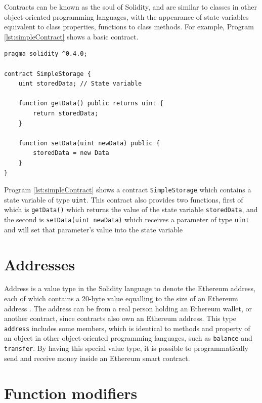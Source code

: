 \documentclass[twoside,draftfooter]{tutthesis} %
\begin{document}
Contracts can be known as the soul of Solidity, and are similar to classes in other object-oriented programming languages, with the appearance of state variables equivalent to class properties, functions to class methods. For example, Program \ref{lst:simpleContract} shows a basic contract.

\begin{lstlisting}[float,caption={A simple contract in Solidity.},label={lst:simpleContract},language=Solidity]
pragma solidity ^0.4.0;

contract SimpleStorage {
    uint storedData; // State variable
    
    function getData() public returns uint {
        return storedData;
    }
    
    function setData(uint newData) public {
        storedData = new Data
    }
}
\end{lstlisting}
\label{lst:simpleContract}

Program \ref{lst:simpleContract} shows a contract \texttt{SimpleStorage} which contains a state variable of type \texttt{uint}. This contract also provides two functions, first of which is \texttt{getData()} which returns the value of the state variable \texttt{storedData}, and the second is \texttt{setData(uint newData)} which receives a parameter of type \texttt{uint} and will set that parameter's value into the state variable

\section{Addresses}

Address is a value type in the Solidity language to denote the Ethereum address, each of which contains a 20-byte value equalling to the size of an Ethereum address \citep{SolidityDocumentation}. The address can be from a real person holding an Ethereum wallet, or another contract, since contracts also own an Ethereum address. This type \texttt{address} includes some members, which is identical to methods and property of an object in other object-oriented programming languages, such as \texttt{balance} and \texttt{transfer}. By having this special value type, it is possible to programmatically send and receive money inside an Ethereum smart contract.

\section{Function modifiers}
\label{section:functionModifiers}
\end{document}
